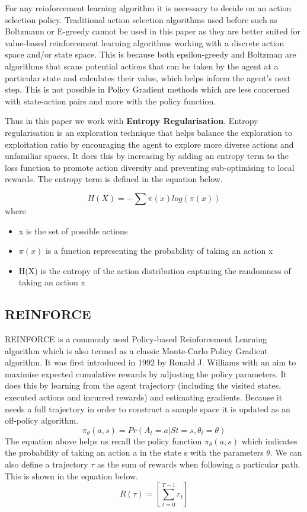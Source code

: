 \documentclass{article}
\begin{document}
\par For any reinforcement learning algorithm it is necessary to decide on an action selection policy. Traditional action selection algorithms used before such as Boltzmann or E-greedy cannot be used in this paper as they are better suited for value-based reinforcement learning algorithms working with a discrete action space and/or state space. This is because both epsilon-greedy and Boltzman are algorithms that scans potential actions that can be taken by the agent at a particular state and calculates their value, which helps inform the agent's next step. This is not possible in Policy Gradient methods which are less concerned with state-action pairs and more with the policy function. 
\par Thus in this paper we work with \textbf{Entropy Regularisation}. Entropy regularisation is an exploration technique that helps balance the exploration to exploitation ratio by encouraging the agent to explore more diverse actions and unfamiliar spaces. It does this by increasing by adding an entropy term to the loss function to promote action diversity and preventing sub-optimising to local rewards. The entropy term is defined in the equation below. %

\begin{equation*}
H(X) = - \sum \pi(x) log(\pi(x)) %
\end{equation*}
where
\begin{itemize}
\renewcommand\labelitemi{.}
\item x is the set of possible actions
\item $\pi(x)$ is a function representing the probability of taking an action x
\item H(X) is the entropy of the action distribution capturing the randomness of taking an action x
\end{itemize}
\subsection{REINFORCE}
\par REINFORCE is a commonly used Policy-based Reinforcement Learning algorithm which is also termed as a classic Monte-Carlo Policy Gradient algorithm. It was first introduced in 1992 by Ronald J. Williams with an aim to maximise expected cumulative rewards by adjusting the policy parameters. It does this by learning from the agent trajectory (including the visited states, executed actions and incurred rewards) and estimating gradients. Because it needs a full trajectory in order to construct a sample space it is updated as an off-policy algorithm. 
\begin{equation}
\pi_\theta(a, s) = Pr(A_t = a | St = s, \theta_t = \theta)
\end{equation}
The equation above helps us recall the policy function $\pi_{\theta}(a, s)$ which indicates the probability of taking an action a in the state s with the parameters $\theta$.
We can also define a trajectory $\tau$ as the sum of rewards when following a particular path. This is shown in the equation below.
\begin{equation}
R(\tau) = [\sum_{t=0}^{T-1}r_t] 
\end{equation}
\end{document}
